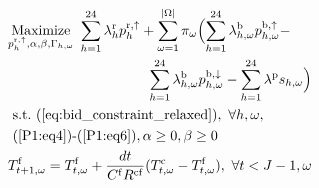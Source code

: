 \documentclass[11pt,a4paper]{article}
\begin{document}
\begin{subequations}\label{P2:FinalModel}
    \begin{align}
           & \underset{p_{h}^{\rm{r},\uparrow}, \alpha, \beta, \Gamma_{h,\omega}}{\text{Maximize}} \ \sum_{h=1}^{24}\lambda_{h}^{\rm{r}} p^{\rm{r}, \uparrow}_{h}+ \sum_{\omega=1}^{|\Omega|} \pi_{\omega}  \Bigl(\sum_{h=1}^{24}  \lambda_{h,\omega}^{\rm{b}} p^{\rm{b},\uparrow}_{h,\omega} - \notag                                                                                                                                                                                                                                                            \\  &  \hspace{3.5cm}\sum_{h=1}^{24}  \lambda_{h,\omega}^{\rm{b}} p^{\rm{b},\downarrow}_{h,\omega} - \sum_{h=1}^{24}  \lambda^{\rm{p}}s_{h,\omega} \Bigr) \label{P2:1} \\
           & \   \text{s.t.}  \  (\ref{eq:bid_constraint_relaxed}), \ \forall{h,\omega},   \label{P2:2}                                                                                                                                                                                                                                                                                                                                                                                                                                                           \\
           & \                                               \text{(\ref{P1:eq4})-(\ref{P1:eq6})}, \alpha \geq 0,   \beta \geq 0 \    \label{P2:3}                                                                                                                                                                                                                                                                                                                                                                                                                \\
           & T^{\rm{f}}_{t+1,\omega} = T^{\rm{f}}_{t,\omega} +  \frac{dt}{C^{\rm{f}}R^{\rm{cf}}} (T^{\rm{c}}_{t,\omega} - T^{\rm{f}}_{t,\omega}), \ \forall{t<J-1,\omega} \label{P2:state-space-1}                                                                                                                                                                                                                                                                                                                                                                \\

\end{align}
\end{subequations}
\end{document}
